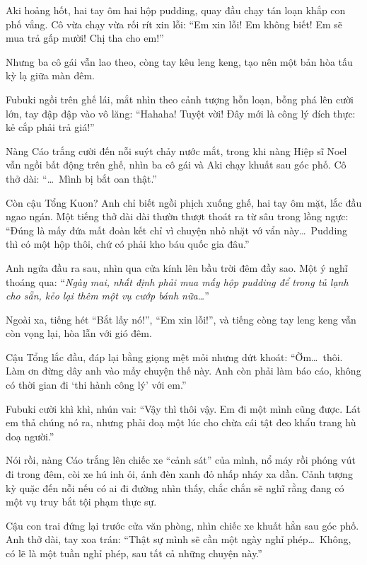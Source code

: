 \documentclass[../main.tex]{subfiles}
\begin{document}
Aki hoảng hốt, hai tay ôm hai hộp pudding, quay đầu chạy tán loạn khắp con phố vắng. Cô vừa chạy vừa rối rít xin lỗi: ``Em xin lỗi! Em không biết! Em sẽ mua trả gấp mười! Chị tha cho em!''

Nhưng ba cô gái vẫn lao theo, còng tay kêu leng keng, tạo nên một bản hòa tấu kỳ lạ giữa màn đêm.

Fubuki ngồi trên ghế lái, mắt nhìn theo cảnh tượng hỗn loạn, bỗng phá lên cười lớn, tay đập đập vào vô lăng: ``Hahaha! Tuyệt vời! Đây mới là công lý đích thực: kẻ cắp phải trả giá!''

Nàng Cáo trắng cười đến nỗi suýt chảy nước mắt, trong khi nàng Hiệp sĩ Noel vẫn ngồi bất động trên ghế, nhìn ba cô gái và Aki chạy khuất sau góc phố. Cô thở dài: ``\dots\ Mình bị bắt oan thật.''

Còn cậu Tổng Kuon? Anh chỉ biết ngồi phịch xuống ghế, hai tay ôm mặt, lắc đầu ngao ngán. Một tiếng thở dài dài thườn thượt thoát ra từ sâu trong lồng ngực: ``Đúng là mấy đứa mất đoàn kết chỉ vì chuyện nhỏ nhặt vớ vẩn này\dots\ Pudding thì có một hộp thôi, chứ có phải kho báu quốc gia đâu.''

Anh ngửa đầu ra sau, nhìn qua cửa kính lên bầu trời đêm đầy sao. Một ý nghĩ thoáng qua: ``\textit{Ngày mai, nhất định phải mua mấy hộp pudding để trong tủ lạnh cho sẵn, kẻo lại thêm một vụ cướp bánh nữa\dots}''

Ngoài xa, tiếng hét ``Bắt lấy nó!'', ``Em xin lỗi!'', và tiếng còng tay leng keng vẫn còn vọng lại, hòa lẫn với gió đêm.



Cậu Tổng lắc đầu, đáp lại bằng giọng mệt mỏi nhưng dứt khoát: ``Ờm\dots\ thôi. Làm ơn đừng dây anh vào mấy chuyện thế này. Anh còn phải làm báo cáo, không có thời gian đi `thi hành công lý' với em.''

Fubuki cười khì khì, nhún vai: ``Vậy thì thôi vậy. Em đi một mình cũng được. Lát em thả chúng nó ra, nhưng phải doạ một lúc cho chừa cái tật đeo khẩu trang hù doạ người.''

Nói rồi, nàng Cáo trắng lên chiếc xe ``cảnh sát'' của mình, nổ máy rồi phóng vút đi trong đêm, còi xe hú inh ỏi, ánh đèn xanh đỏ nhấp nháy xa dần. Cảnh tượng kỳ quặc đến nỗi nếu có ai đi đường nhìn thấy, chắc chắn sẽ nghĩ rằng đang có một vụ truy bắt tội phạm thực sự.

Cậu con trai đứng lại trước cửa văn phòng, nhìn chiếc xe khuất hẳn sau góc phố. Anh thở dài, tay xoa trán: ``Thật sự mình sẽ cần một ngày nghỉ phép\dots\ Không, có lẽ là một tuần nghỉ phép, sau tất cả những chuyện này.''
\end{document}
